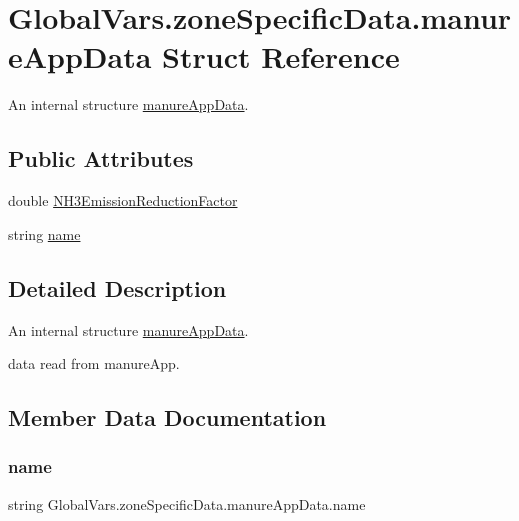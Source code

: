 \hypertarget{struct_global_vars_1_1zone_specific_data_1_1manure_app_data}{}\section{Global\+Vars.\+zone\+Specific\+Data.\+manure\+App\+Data Struct Reference}
\label{struct_global_vars_1_1zone_specific_data_1_1manure_app_data}


An internal structure \mbox{\hyperlink{struct_global_vars_1_1zone_specific_data_1_1manure_app_data}{manure\+App\+Data}}.  


\subsection*{Public Attributes}
\begin{DoxyCompactItemize}
\item 
double \mbox{\hyperlink{struct_global_vars_1_1zone_specific_data_1_1manure_app_data_a0b82f6dc3e8aaa6c3039b765d74bf66a}{N\+H3\+Emission\+Reduction\+Factor}}
\item 
string \mbox{\hyperlink{struct_global_vars_1_1zone_specific_data_1_1manure_app_data_aa848820d888c7adb178c6c76fd6f9a6b}{name}}
\end{DoxyCompactItemize}


\subsection{Detailed Description}
An internal structure \mbox{\hyperlink{struct_global_vars_1_1zone_specific_data_1_1manure_app_data}{manure\+App\+Data}}. 

data read from manure\+App. 

\subsection{Member Data Documentation}
\mbox{\label{struct_global_vars_1_1zone_specific_data_1_1manure_app_data_aa848820d888c7adb178c6c76fd6f9a6b}} 
\subsubsection{\texorpdfstring{name}{name}}
{\footnotesize\ttfamily string Global\+Vars.\+zone\+Specific\+Data.\+manure\+App\+Data.\+name}

